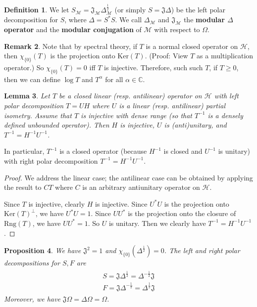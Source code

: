 \documentclass[12pt,b5paper,notitlepage]{article}
\theoremstyle{definition}
\newtheorem{df}{Definition}[section]
\newtheorem{rem}[df]{Remark}
\theoremstyle{plain}
\newtheorem{pp}[df]{Proposition}
\newtheorem{lm}[df]{Lemma}
\newcommand{\fk}{\mathfrak}
\newcommand{\mc}{\mathcal}
\newcommand{\Cbb}{\mathbb C}
\newcommand{\Ker}{\mathrm{Ker}}
\newcommand{\Rng}{\mathrm{Rng}}
\numberwithin{equation}{section}
\begin{document}
\subsection{}


\begin{df}
We let $S_{\mc M}=\fk J_{\mc M}\Delta_{\mc M}^{\frac 12}$ (or simply $S=\fk J\Delta$) be the left polar decomposition for $S$, where $\Delta=S^*S$. We call $\Delta_{\mc M}$ and $\fk J_{\mc M}$ the \textbf{modular $\Delta$ operator}  and the \textbf{modular conjugation}  of $\mc M$ with respect to $\Omega$. 
\end{df}


\begin{rem}
Note that by spectral theory, if $T$ is a normal closed operator on $\mc H$, then $\chi_{\{0\}}(T)$ is the projection onto $\Ker(T)$. (Proof: View $T$ as a multiplication operator.) So $\chi_{\{0\}}(T)=0$ iff $T$ is injective. Therefore, such such $T$, if $T\geq0$, then we can define $\log T$ and $T^\alpha$ for all $\alpha\in\Cbb$.
\end{rem}


\begin{lm}\label{lb94}
Let $T$ be a closed linear (resp. antilinear) operator on $\mc H$ with left polar decomposition $T=UH$ where $U$ is a linear (resp. antilinear) partial isometry. Assume that $T$ is injective with dense range (so that $T^{-1}$ is a densely defined unbounded operator). Then $H$ is injective, $U$ is (anti)unitary, and $T^{-1}=H^{-1}U^{-1}$.
\end{lm}

In particular, $T^{-1}$ is a closed operator (because $H^{-1}$ is closed and $U^{-1}$ is unitary) with right polar decomposition $T^{-1}=H^{-1}U^{-1}$.


\begin{proof}
We address the linear case; the antilinear case can be obtained by applying the result to $CT$ where $C$ is an arbitrary antiunitary operator on $\mc H$.  

Since $T$ is injective, clearly $H$ is injective. Since $U^*U$ is the projection onto $\Ker(T)^\perp$, we have $U^*U=1$. Since $UU^*$ is the projection onto the closure of $\Rng(T)$, we have $UU^*=1$. So $U$ is unitary.  Then we clearly have $T^{-1}=H^{-1}U^{-1}$. 
\end{proof}



\begin{pp}
We have $\fk J^2=1$ and $\chi_{\{0\}}(\Delta^{\frac 12})=0$. The left and right polar decompositions for $S,F$ are
\begin{gather}\label{eq125}
\begin{gathered}
S=\fk J\Delta^{\frac 12}=\Delta^{-\frac 12}\fk J\\
F=\fk J\Delta^{-\frac 12}=\Delta^{\frac 12}\fk J
\end{gathered}
\end{gather}
Moreover, we have $\fk J\Omega=\Delta\Omega=\Omega$.
\end{pp}
\end{document}
